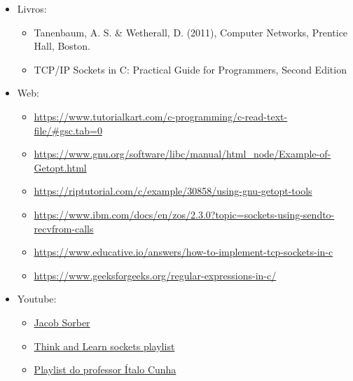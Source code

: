 \documentclass{article}
\begin{document}
\begin{itemize}
      \item Livros:
            \begin{itemize}
                  \item Tanenbaum, A. S. \& Wetherall, D. (2011), Computer
                        Networks, Prentice Hall, Boston.
                  \item TCP/IP Sockets in C\@: Practical Guide for Programmers,
                        Second Edition
            \end{itemize}

      \item Web:
            \begin{itemize}
                  \item

                        \url{https://www.tutorialkart.com/c-programming/c-read-text-file/#gsc.tab=0}
                  \item

                        \url{https://www.gnu.org/software/libc/manual/html_node/Example-of-Getopt.html}
                  \item

                        \url{https://riptutorial.com/c/example/30858/using-gnu-getopt-tools}
                  \item

                        \url{https://www.ibm.com/docs/en/zos/2.3.0?topic=sockets-using-sendto-recvfrom-calls}
                  \item

                        \url{https://www.educative.io/answers/how-to-implement-tcp-sockets-in-c}
                  \item

                        \url{https://www.geeksforgeeks.org/regular-expressions-in-c/}
            \end{itemize}

      \item Youtube:
            \begin{itemize}
                  \item \href{https://www.youtube.com/@JacobSorber}{Jacob
                              Sorber}
                  \item

                        \href{https://www.youtube.com/watch?v=_lQ-3S4fJ0U&list=PLPyaR5G9aNDvs6TtdpLcVO43_jvxp4emI}{Think
                              and Learn sockets playlist}
                  \item

                        \href{https://www.youtube.com/watch?v=tJ3qNtv0HVs&t=2s}{Playlist do professor
                              Ítalo Cunha}
            \end{itemize}

\end{itemize}
\end{document}
